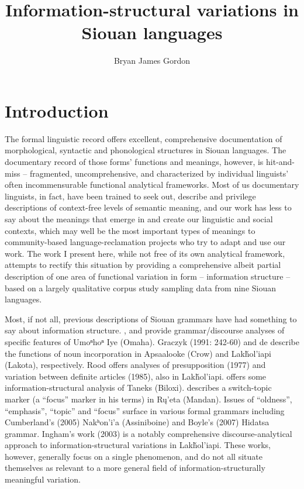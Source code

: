 \documentclass[output=paper]{LSP/langsci}
\author{Bryan James Gordon}
\title{Information-structural variations in Siouan languages}
\begin{document}
\section{Introduction}

	The formal linguistic record offers excellent, comprehensive documentation of morphological, syntactic and phonological structures in Siouan languages. The documentary record of those forms’ functions and meanings, however, is hit-and-miss -- fragmented, uncomprehensive, and characterized by individual linguists’ often incommensurable functional analytical frameworks. Most of us documentary linguists, in fact, have been trained to seek out, describe and privilege descriptions of context-free levels of semantic meaning, and our work has less to say about the meanings that emerge in and create our linguistic and social contexts, which may well be the most important types of meanings to community-based language-reclamation projects who try to adapt and use our work. The work I present here, while not free of its own analytical framework, attempts to rectify this situation by providing a comprehensive albeit partial description of one area of functional variation in form -- information structure -- based on a largely qualitative corpus study sampling data from nine Siouan languages.
	
	Most, if not all, previous descriptions of Siouan grammars have had something to say about information structure. \citet{Rudin1998}, \citet{Koontz2003} and \citet{Eschenberg2005} provide grammar/discourse analyses of specific features of Umoⁿhoⁿ Iye (Omaha). Graczyk (1991: 242-60) and de \citet{Reuse1994} describe the functions of noun incorporation in Apsaalooke (Crow) and Lakȟol’iapi (Lakota), respectively. Rood offers analyses of presupposition (1977) and variation between definite articles (1985), also in Lakȟol’iapi. \citet{Kaufman2008} offers some information-structural analysis of Taneks (Biloxi). \citet{Wolvengrey1990} describes a switch-topic marker (a “focus” marker in his terms) in Rų’eta (Mandan). Issues of “oldness”, “emphasis”, “topic” and “focus” surface in various formal grammars including Cumberland’s (2005) Nakʰon’i’a (Assiniboine) and Boyle’s (2007) Hidatsa grammar. Ingham’s work (2003) is a notably comprehensive discourse-analytical approach to in\-for\-ma\-tion-structural variations in La\-kȟol\-’ia\-pi. These works, however, generally focus on a single phenomenon, and do not all situate themselves as relevant to a more general field of information-structurally meaningful variation. 
	
\end{document}
